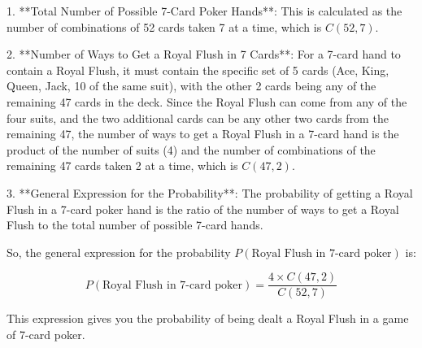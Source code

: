 \documentclass{article}
\begin{document}
1. **Total Number of Possible 7-Card Poker Hands**: This is calculated as the number of combinations of 52 cards taken 7 at a time, which is \(C(52, 7)\).

2. **Number of Ways to Get a Royal Flush in 7 Cards**: For a 7-card hand to contain a Royal Flush, it must contain the specific set of 5 cards (Ace, King, Queen, Jack, 10 of the same suit), with the other 2 cards being any of the remaining 47 cards in the deck. Since the Royal Flush can come from any of the four suits, and the two additional cards can be any other two cards from the remaining 47, the number of ways to get a Royal Flush in a 7-card hand is the product of the number of suits (4) and the number of combinations of the remaining 47 cards taken 2 at a time, which is \(C(47, 2)\).

3. **General Expression for the Probability**: The probability of getting a Royal Flush in a 7-card poker hand is the ratio of the number of ways to get a Royal Flush to the total number of possible 7-card hands. 

So, the general expression for the probability \(P(\text{Royal Flush in 7-card poker})\) is:

\[
P(\text{Royal Flush in 7-card poker}) = \frac{4 \times C(47, 2)}{C(52, 7)}
\]

This expression gives you the probability of being dealt a Royal Flush in a game of 7-card poker.
\end{document}
